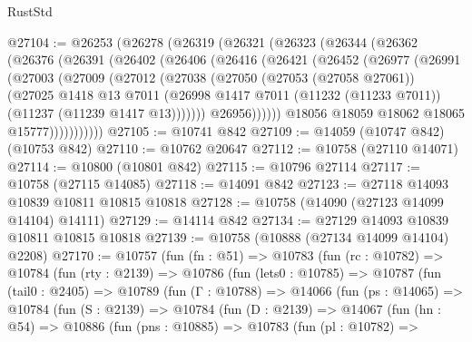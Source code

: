 \begin{lexlean}{RustStd}
\begin{coremodule}
@27104 := @26253
    (@26278
      (@26319
        (@26321
          (@26323
            (@26344
              (@26362
                (@26376
                  (@26391
                    (@26402
                      (@26406
                        (@26416
                          (@26421
                            (@26452
                              (@26977
                                (@26991
                                  (@27003
                                    (@27009
                                      (@27012
                                        (@27038
                                          (@27050
                                            (@27053 (@27058 @27061))
                                            (@27025
                                              @1418
                                              @13
                                              @7011
                                              (@26998
                                                @1417
                                                @7011
                                                (@11232 (@11233 @7011))
                                                (@11237 (@11239 @1417 @13)))))))
                                      @26956))))))
                          @18056
                          @18059
                          @18062
                          @18065
                          @15777)))))))))))
@27105 := @10741 @842
@27109 := @14059 (@10747 @842) (@10753 @842)
@27110 := @10762 @20647
@27112 := @10758 (@27110 @14071)
@27114 := @10800 (@10801 @842)
@27115 := @10796 @27114
@27117 := @10758 (@27115 @14085)
@27118 := @14091 @842
@27123 := @27118 @14093 @10839 @10811 @10815 @10818
@27128 := @10758 (@14090 (@27123 @14099 @14104) @14111)
@27129 := @14114 @842
@27134 := @27129 @14093 @10839 @10811 @10815 @10818
@27139 := @10758 (@10888 (@27134 @14099 @14104) @2208)
@27170 := @10757
    (fun (fn : @51) =>
    @10783
      (fun (rc : @10782) =>
      @10784
        (fun (rty : @2139) =>
        @10786
          (fun (lets0 : @10785) =>
          @10787
            (fun (tail0 : @2405) =>
            @10789
              (fun (Γ : @10788) =>
              @14066
                (fun (ps : @14065) =>
                @10784
                  (fun (S : @2139) =>
                  @10784
                    (fun (D : @2139) =>
                    @14067
                      (fun (hn : @54) =>
                      @10886
                        (fun (pns : @10885) =>
                        @10783
                          (fun (pl : @10782) =>

\end{coremodule}
\end{lexlean}
